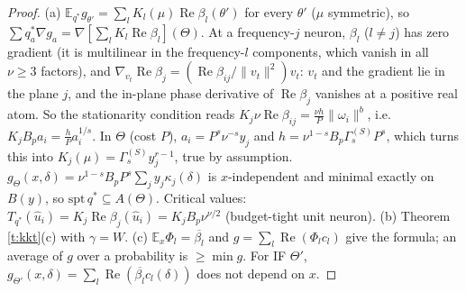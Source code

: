 \documentclass[11pt]{article}
\theoremstyle{remark}\newtheorem{remark}[theorem]{Remark}
\newcommand{\E}{\mathbb E}\newcommand{\R}{\mathbb R}\newcommand{\Re}{\operatorname{Re}}
\begin{document}
\begin{proof}
(a) $\E_{q^*}g_{\theta'}=\sum_lK_l(\mu)\Re\beta_l(\theta')$ for every $\theta'$ ($\mu$ symmetric), so $\sum q^*_a\nabla g_a=\nabla[\sum_lK_l\Re\beta_l](\Theta)$.
At a frequency-$j$ neuron, $\beta_l$ ($l\ne j$) has zero gradient (it is multilinear in the frequency-$l$ components, which vanish in all $\nu\ge3$ factors), and
$\nabla_{v_t}\Re\beta_j=(\Re\beta_{ij}/\|v_t\|^2)v_t$: $v_t$ and the gradient lie in the plane $j$, and the in-plane phase derivative of $\Re\beta_j$ vanishes at a positive real atom.
So the stationarity condition reads $K_j\nu\Re\beta_{ij}=\frac{\nu h}P\|\omega_i\|^b$, i.e.\ $K_jB_pa_i=\frac hPa_i^{1/s}$. In $\Theta$ (cost $P$),
$a_i=P^s\nu^{-s}y_j$ and $h=\nu^{1-s}B_p\Gamma^{(S)}_sP^s$, which turns this into $K_j(\mu)=\Gamma^{(S)}_sy_j^{r-1}$, true by assumption.
$g_\Theta(x,\delta)=\nu^{1-s}B_pP^s\sum_jy_j\kappa_j(\delta)$ is $x$-independent and minimal exactly on $B(y)$, so $\mathrm{spt}\,q^*\subseteq A(\Theta)$.
Critical values: $T_{q^*}(\hat u_i)=K_j\Re\beta_j(\hat u_i)=K_jB_p\nu^{\nu/2}$ (budget-tight unit neuron).
(b) Theorem \ref{t:kkt}(c) with $\gamma=W$. (c) $\E_x\Phi_l=\overline{\beta_l}$ and $g=\sum_l\Re(\Phi_lc_l)$ give the formula; an average of $g$ over a
probability is $\ge\min g$. For IF $\Theta'$, $g_{\Theta'}(x,\delta)=\sum_l\Re(\overline{\beta_l}c_l(\delta))$ does not depend on $x$.
\end{proof}
\end{document}
